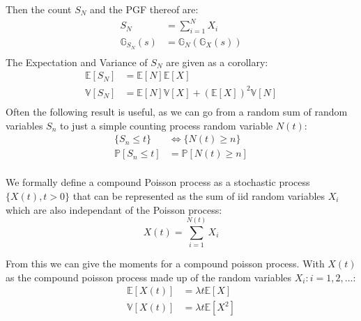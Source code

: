 Then the count \(S_N\) and the PGF thereof are:
\begin{equation*}
    \begin{aligned}
        S_N &= \sum_{i=1}^{N} X_i \\
        \mathbb{G}_{S_N}(s) &= \mathbb{G}_N(\mathbb{G}_X(s)) \\
    \end{aligned}
\end{equation*}
The Expectation and Variance of \(S_N\) are given as a corollary:
\begin{equation*}
    \begin{aligned}
        \mathbb{E}[S_N] &= \mathbb{E}[N] \mathbb{E}[X]\\
        \mathbb{V}[S_N] &= \mathbb{E}[N]\mathbb{V}[X] + \left( \mathbb{E}[X]\right)^2 \mathbb{V}[N]\\
    \end{aligned}
\end{equation*}
Often the following result is useful, as we can go from a random sum of random
variables $S_n$ to just a simple counting process random variable $N(t)$:
\begin{equation*}
    \begin{aligned}
        \{S_n \le t\} &\iff \{N(t) \ge n\} \\
        \mathbb{P}[S_n \le t] &= \mathbb{P}[N(t) \ge n]  \\
    \end{aligned}
\end{equation*}

We formally define a compound Poisson process as a stochastic 
process \(\{X(t), t > 0\}\) that can be represented as the sum of iid random variables \(X_i\) which are also independant of the Poisson process:
\begin{equation*}
    X(t) = \sum_{i = 1}^{N(t)} X_i
\end{equation*}

From this we can give the moments for a compound poisson process. With \(X(t)\) as the 
compound poisson process made up of the random variables \(X_i: i=1, 2, \dots\):
\begin{equation*}
    \begin{aligned}
        \mathbb{E}[X(t)] &= \lambda t \mathbb{E}[X]   \\
        \mathbb{V}[X(t)] &= \lambda t \mathbb{E}[X^2] \\
    \end{aligned}
\end{equation*}
